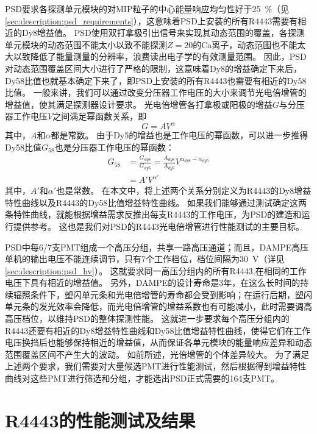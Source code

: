 PSD要求各探测单元模块的对MIP粒子的中心能量响应均匀性好于\SI{25}{\percent}（见\ref{sec:description:psd_requirements}），这意味着PSD上安装的所有R4443需要有相近的Dy8增益值。
PSD使用双打拿极引出信号来实现其动态范围的覆盖，各探测单元模块的动态范围不能太小以致不能探测$Z=20$的Ca离子，动态范围也不能太大以致降低了能量测量的分辨率，浪费读出电子学的有效测量范围。
因此，PSD对动态范围覆盖区间大小进行了严格的限制，这意味着Dy8的增益确定下来后，Dy58比值也就基本确定下来了，即PSD上安装的所有R4443也需要有相近的Dy58比值。
一般来讲，我们可以通过改变分压器工作电压的大小来调节光电倍增管的增益值，使其满足探测器设计要求。
光电倍增管各打拿极或阳极的增益$G$与分压器工作电压$V$之间满足幂函数关系，即
\begin{equation}
	G = A V^\alpha
	\label{eq:pmt_test:gain_powerfunction}
\end{equation}
其中，$A$和$\alpha$都是常数。
由于Dy5的增益也是工作电压的幂函数，可以进一步推得Dy58比值$G_{58}$也是分压器工作电压的幂函数：
\begin{align}
	G_{58} &= \frac{G_{dy8}}{G_{dy5}} = \frac{A_{dy8}}{A_{dy5}} V^{\alpha_{dy8}-\alpha_{dy5}}      \\
		   &= A' V^{\alpha'}
\end{align}
其中，$A'$和$\alpha'$也是常数。
在本文中，将上述两个关系分别定义为R4443的Dy8增益特性曲线以及R4443的Dy58比值增益特性曲线。
如果我们能够通过测试确定这两条特性曲线，就能根据增益需求反推出每支R4443的工作电压，为PSD的建造和运行提供参考。
这也是我们对PSD的R4443光电倍增管进行性能测试的主要目标。

PSD中每6/7支PMT组成一个高压分组，共享一路高压通道；而且，DAMPE高压单机的输出电压不能连续调节，只有7个工作档位，档位间隔为\SI{30}{V}（详见\ref{sec:description:psd_hv}）。
这就要求同一高压分组内的所有R4443,在相同的工作电压下具有相近的增益值。
另外，DAMPE的设计寿命是3年，在这么长时间的持续辐照条件下，塑闪单元条和光电倍增管的寿命都会受到影响；在运行后期，塑闪单元条的发光效率会降低，而光电倍增管的增益系数也有可能减小，此时需要调高高压档位，以维持PSD的整体探测性能。
这就进一步要求每个高压分组内的R4443还要有相近的Dy8增益特性曲线和Dy58比值增益特性曲线，使得它们在工作电压换挡后也能够保持相近的增益值，从而保证各单元模块的能量响应差异和动态范围覆盖区间不产生大的波动。
如前所述，光倍增管的个体差异较大。
为了满足上述两个要求，我们需要对大量候选PMT进行性能测试，然后根据得到增益特性曲线对这些PMT进行筛选和分组，才能选出PSD正式需要的164支PMT。

\section{R4443的性能测试及结果}
\label{sec:pmt_test:characterization}
